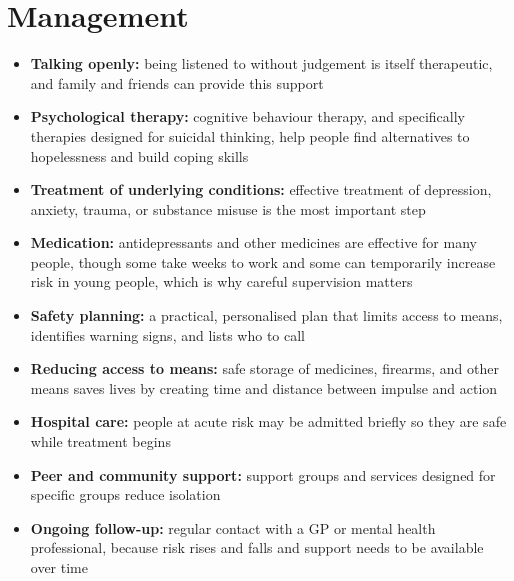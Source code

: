 \section*{Management}
\begin{itemize}
    \item \textbf{Talking openly:} being listened to without judgement is itself therapeutic, and family and friends can provide this support
    \item \textbf{Psychological therapy:} cognitive behaviour therapy, and specifically therapies designed for suicidal thinking, help people find alternatives to hopelessness and build coping skills
    \item \textbf{Treatment of underlying conditions:} effective treatment of depression, anxiety, trauma, or substance misuse is the most important step
    \item \textbf{Medication:} antidepressants and other medicines are effective for many people, though some take weeks to work and some can temporarily increase risk in young people, which is why careful supervision matters
    \item \textbf{Safety planning:} a practical, personalised plan that limits access to means, identifies warning signs, and lists who to call
    \item \textbf{Reducing access to means:} safe storage of medicines, firearms, and other means saves lives by creating time and distance between impulse and action
    \item \textbf{Hospital care:} people at acute risk may be admitted briefly so they are safe while treatment begins
    \item \textbf{Peer and community support:} support groups and services designed for specific groups reduce isolation
    \item \textbf{Ongoing follow-up:} regular contact with a GP or mental health professional, because risk rises and falls and support needs to be available over time
\end{itemize}

